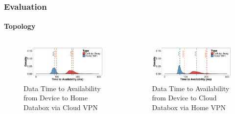 \documentclass[aspectratio=169]{beamer}
\begin{document}
\begin{frame}
	\frametitle{Evaluation}
	\framesubtitle{Topology}

	\begin{columns}[c]
		\begin{figure}
			\centering
			\includegraphics[width=\columnwidth]{acc-inout-cloud-home}
			\caption{Data Time to Availability from Device to Home Databox via Cloud VPN}
		\end{figure}
		\begin{figure}
			\centering
			\includegraphics[width=\columnwidth]{acc-inout-home-cloud}
			\caption{Data Time to Availability from Device to Cloud Databox via Home VPN}
		\end{figure}
	\end{columns}
\end{frame}
\end{document}
